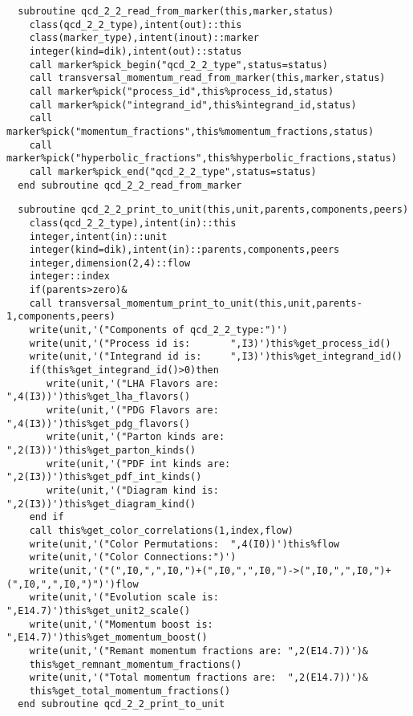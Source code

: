 \begin{Verbatim}
  subroutine qcd_2_2_read_from_marker(this,marker,status)
    class(qcd_2_2_type),intent(out)::this
    class(marker_type),intent(inout)::marker
    integer(kind=dik),intent(out)::status
    call marker%pick_begin("qcd_2_2_type",status=status)
    call transversal_momentum_read_from_marker(this,marker,status)
    call marker%pick("process_id",this%process_id,status)
    call marker%pick("integrand_id",this%integrand_id,status)
    call marker%pick("momentum_fractions",this%momentum_fractions,status)
    call marker%pick("hyperbolic_fractions",this%hyperbolic_fractions,status)
    call marker%pick_end("qcd_2_2_type",status=status)
  end subroutine qcd_2_2_read_from_marker
\end{Verbatim}

\begin{Verbatim}
  subroutine qcd_2_2_print_to_unit(this,unit,parents,components,peers)
    class(qcd_2_2_type),intent(in)::this
    integer,intent(in)::unit
    integer(kind=dik),intent(in)::parents,components,peers
    integer,dimension(2,4)::flow
    integer::index
    if(parents>zero)&
    call transversal_momentum_print_to_unit(this,unit,parents-1,components,peers)
    write(unit,'("Components of qcd_2_2_type:")')
    write(unit,'("Process id is:       ",I3)')this%get_process_id()
    write(unit,'("Integrand id is:     ",I3)')this%get_integrand_id()
    if(this%get_integrand_id()>0)then
       write(unit,'("LHA Flavors are:     ",4(I3))')this%get_lha_flavors()
       write(unit,'("PDG Flavors are:     ",4(I3))')this%get_pdg_flavors()
       write(unit,'("Parton kinds are:    ",2(I3))')this%get_parton_kinds()
       write(unit,'("PDF int kinds are:   ",2(I3))')this%get_pdf_int_kinds()
       write(unit,'("Diagram kind is:     ",2(I3))')this%get_diagram_kind()
    end if
    call this%get_color_correlations(1,index,flow)
    write(unit,'("Color Permutations:  ",4(I0))')this%flow
    write(unit,'("Color Connections:")')
    write(unit,'("(",I0,",",I0,")+(",I0,",",I0,")->(",I0,",",I0,")+(",I0,",",I0,")")')flow
    write(unit,'("Evolution scale is:  ",E14.7)')this%get_unit2_scale()
    write(unit,'("Momentum boost is:   ",E14.7)')this%get_momentum_boost()
    write(unit,'("Remant momentum fractions are: ",2(E14.7))')&
    this%get_remnant_momentum_fractions()
    write(unit,'("Total momentum fractions are:  ",2(E14.7))')&
    this%get_total_momentum_fractions()
  end subroutine qcd_2_2_print_to_unit
\end{Verbatim}

